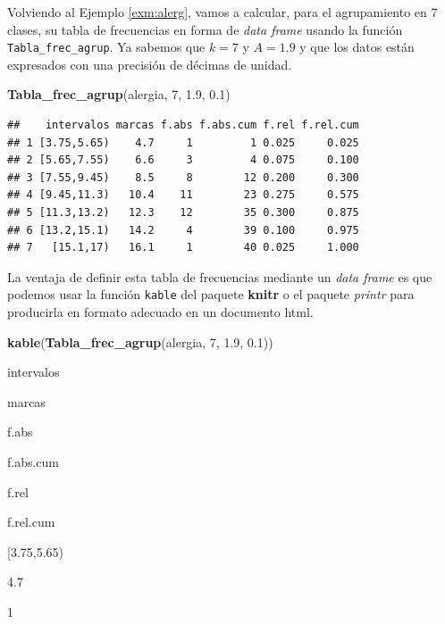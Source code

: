 \documentclass[]{book}
\newenvironment{Shaded}{\begin{snugshade}}{\end{snugshade}}
\newcommand{\DecValTok}[1]{\textcolor[rgb]{0.00,0.00,0.81}{#1}}
\newcommand{\FloatTok}[1]{\textcolor[rgb]{0.00,0.00,0.81}{#1}}
\newcommand{\KeywordTok}[1]{\textcolor[rgb]{0.13,0.29,0.53}{\textbf{#1}}}
\newcommand{\NormalTok}[1]{#1}
\theoremstyle{definition}
\theoremstyle{definition}
\theoremstyle{definition}
\theoremstyle{remark}
\let\BeginKnitrBlock\begin \let\EndKnitrBlock\end
\begin{document}
\BeginKnitrBlock{example}
\protect\hypertarget{exm:unnamed-chunk-658}{}{\label{exm:unnamed-chunk-658} }Volviendo al Ejemplo \ref{exm:alerg}, vamos a calcular, para el agrupamiento en 7 clases, su tabla de frecuencias en forma de \emph{data frame} usando la función \texttt{Tabla\_frec\_agrup}. Ya sabemos que \(k=7\) y \(A=1.9\) y que los datos están expresados con una precisión de décimas de unidad.
\EndKnitrBlock{example}

\begin{Shaded}
\begin{Highlighting}[]
\KeywordTok{Tabla_frec_agrup}\NormalTok{(alergia, }\DecValTok{7}\NormalTok{, }\FloatTok{1.9}\NormalTok{, }\FloatTok{0.1}\NormalTok{)}
\end{Highlighting}
\end{Shaded}

\begin{verbatim}
##    intervalos marcas f.abs f.abs.cum f.rel f.rel.cum
## 1 [3.75,5.65)    4.7     1         1 0.025     0.025
## 2 [5.65,7.55)    6.6     3         4 0.075     0.100
## 3 [7.55,9.45)    8.5     8        12 0.200     0.300
## 4 [9.45,11.3)   10.4    11        23 0.275     0.575
## 5 [11.3,13.2)   12.3    12        35 0.300     0.875
## 6 [13.2,15.1)   14.2     4        39 0.100     0.975
## 7   [15.1,17)   16.1     1        40 0.025     1.000
\end{verbatim}

La ventaja de definir esta tabla de frecuencias mediante un \emph{data frame} es que podemos usar la función \texttt{kable} del paquete \textbf{knitr} o el paquete \emph{printr} para producirla en formato adecuado en un documento html.

\begin{Shaded}
\begin{Highlighting}[]
\KeywordTok{kable}\NormalTok{(}\KeywordTok{Tabla_frec_agrup}\NormalTok{(alergia, }\DecValTok{7}\NormalTok{, }\FloatTok{1.9}\NormalTok{, }\FloatTok{0.1}\NormalTok{))}
\end{Highlighting}
\end{Shaded}

intervalos

marcas

f.abs

f.abs.cum

f.rel

f.rel.cum

{[}3.75,5.65)

4.7

1
\end{document}
